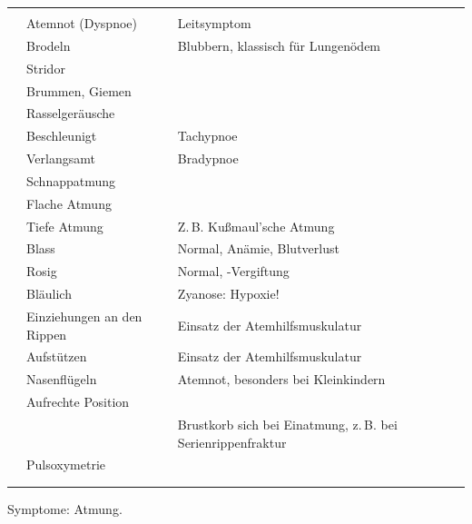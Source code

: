 {}
{}
{}
{\begin{tabulary}{\linewidth}[H]{LLLL}
\toprule\addlinespace
\noindent{}
 &
\noindent{}
 &
\noindent{}
 &
\\\addlinespace\midrule\addlinespace
\noindent{}
 &
Atemnot (Dyspnoe) 
 &
Leitsymptom
 &
\\\addlinespace
\noindent{}
 &
Brodeln 
 &
Blubbern, klassisch für Lungenödem
 &
\\\addlinespace
 &
Stridor 
 &
 &
\\\addlinespace
 &
Brummen, Giemen
& &
\\\addlinespace
 &
Rasselgeräusche 
 &
 &
\\\addlinespace
\noindent{}
 &
Beschleunigt
 &
Tachypnoe 
 &
\\\addlinespace
 &
Verlangsamt
 &
Bradypnoe 
 &
\\\addlinespace
\noindent{}
 &
Schnappatmung
 &
 &
\\\addlinespace
 &
Flache Atmung
 &
 &
\\\addlinespace
 &
Tiefe Atmung
 &
Z.\,B. Kußmaul'sche Atmung
 &
\\\addlinespace
\noindent{}
 &
Blass
 &
Normal, Anämie, Blutverlust
 &
\\\addlinespace
 &
Rosig
 &
Normal, -Vergiftung
 &
\\\addlinespace
 &
Bläulich 
 &
Zyanose: Hypoxie!
 &
\\\addlinespace
\noindent{}
 &
Einziehungen an den Rippen
&
Einsatz der Atemhilfsmuskulatur
&
\\\addlinespace
&
Aufstützen
&
Einsatz der Atemhilfsmuskulatur
&
\\\addlinespace
&
Nasenflügeln 
&
Atemnot, besonders bei Kleinkindern
&
\\\addlinespace
&
Aufrechte Position
&
&
\\\addlinespace
&
&
Brustkorb  sich bei Einatmung, z.\,B. bei
Serienrippenfraktur 
&
\\\addlinespace
\noindent{}
&
Pulsoxymetrie
&
&
\\\addlinespace
&
&
\\\addlinespace\bottomrule
\end{tabulary}}
{Symptome: Atmung.\label{tab:atmung-symptome}}
{}





